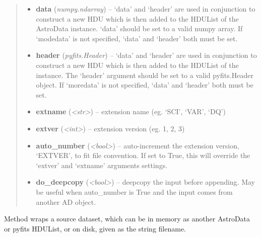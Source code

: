 \documentclass[letterpaper,10pt,english]{sphinxmanual}
\begin{document}
\begin{fulllineitems}
\begin{fulllineitems}
\begin{quote}
\begin{description}
\begin{itemize}
\item {} 
\textbf{data} (\emph{numpy.ndarray}) -- `data' and `header' are used in conjunction to construct a
new HDU which is then added to the HDUList of the AstroData
instance. `data' should be set to a valid numpy array. 
If `modedata' is not specified, `data' and `header' both
must be set.

\item {} 
\textbf{header} (\emph{pyfits.Header}) -- `data' and `header' are used in conjunction to construct
a new HDU which is then added to the HDUList of the
instance. The `header' argument should be set to a valid
pyfits.Header object. If `moredata' is not specified,
`data' and `header' both must be set.

\item {} 
\textbf{extname} (\emph{\textless{}str\textgreater{}}) -- extension name (eg. `SCI', `VAR', `DQ')

\item {} 
\textbf{extver} (\emph{\textless{}int\textgreater{}}) -- extension version (eg. 1, 2, 3)

\item {} 
\textbf{auto\_number} (\emph{\textless{}bool\textgreater{}}) -- auto-increment the extension version, `EXTVER',
to fit file convention. If set to True, this will
override the `extver' and `extname' arguments
settings.

\item {} 
\textbf{do\_deepcopy} (\emph{\textless{}bool\textgreater{}}) -- deepcopy the input before appending. May be useful
when auto\_number is True and the input comes from
another AD object.

\end{itemize}

\end{description}\end{quote}

\end{fulllineitems}


\begin{fulllineitems}
\label{astro_class:astrodata.AstroData.AstroData.open}
Method wraps a source dataset, which can be in memory as another
AstroData or pyfits HDUList, or on disk, given as the string filename.


\end{fulllineitems}
\end{fulllineitems}
\end{document}
